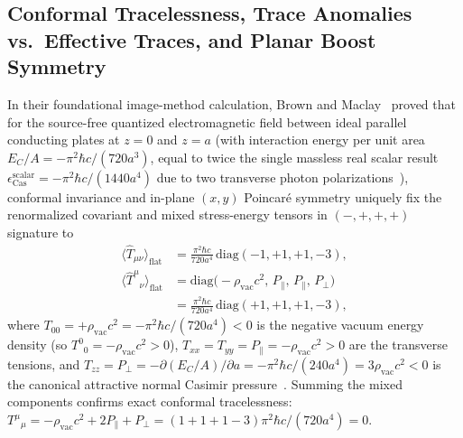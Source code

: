 \documentclass[aps,prd,twocolumn,10pt,showkeys,nofootinbib,floatfix,longbibliography]{revtex4-2}
\begin{document}
\subsection{Conformal Tracelessness, Trace Anomalies vs.\ Effective Traces, and Planar Boost Symmetry}
In their foundational image-method calculation, Brown and Maclay~\cite{brown1969} proved that for the source-free quantized electromagnetic field between ideal parallel conducting plates at $z=0$ and $z=a$ (with interaction energy per unit area $E_C/A = -\pi^2\hbar c/(720 a^3)$, equal to twice the single massless real scalar result $\epsilon_{\mathrm{Cas}}^{\mathrm{scalar}} = -\pi^2\hbar c/(1440 a^4)$ due to two transverse photon polarizations~\cite{casimir1948,bordag2009}), conformal invariance and in-plane $(x,y)$ Poincaré symmetry uniquely fix the renormalized covariant and mixed stress-energy tensors in $(-,+,+,+)$ signature to
\begin{align}
\langle \hat{T}_{\mu\nu} \rangle_{\mathrm{flat}} &= \frac{\pi^2 \hbar c}{720 a^4} \, \mathrm{diag}(-1, +1, +1, -3), \nonumber\\
\langle \hat{T}^\mu{}_\nu \rangle_{\mathrm{flat}} &= \mathrm{diag}\bigl(-\rho_{\mathrm{vac}}c^2,\, P_\parallel,\, P_\parallel,\, P_\perp\bigr) \nonumber\\
&= \frac{\pi^2 \hbar c}{720 a^4} \, \mathrm{diag}(+1, +1, +1, -3),
\label{eq:brown_maclay}
\end{align}
where $T_{00} = +\rho_{\mathrm{vac}} c^2 = -\pi^2\hbar c/(720 a^4) < 0$ is the negative vacuum energy density (so $T^0{}_0 = -\rho_{\mathrm{vac}}c^2 > 0$), $T_{xx} = T_{yy} = P_\parallel = -\rho_{\mathrm{vac}} c^2 > 0$ are the transverse tensions, and $T_{zz} = P_\perp = -\partial(E_C/A)/\partial a = -\pi^2\hbar c/(240 a^4) = 3\rho_{\mathrm{vac}} c^2 < 0$ is the canonical attractive normal Casimir pressure~\cite{casimir1948,klimchitskaya2009rmp}. Summing the mixed components confirms exact conformal tracelessness: $T^\mu{}_\mu = -\rho_{\mathrm{vac}}c^2 + 2P_\parallel + P_\perp = (1 + 1 + 1 - 3)\pi^2\hbar c/(720 a^4) = 0$.
\end{document}
